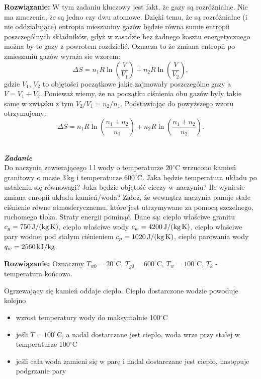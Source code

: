 \documentclass[11pt,a4paper]{article}
\newcounter{zadanie}\newcommand{\zadanie}[1][]{\addtocounter{zadanie}{1} ~\\  {\bf \emph{Zadanie \arabic{zadanie} #1 }} \\}
\begin{document}
\vskip 10pt
\noindent
\textbf{Rozwiązanie:}
W tym zadaniu kluczowy jest fakt, że gazy są rozróżnialne. Nie ma znaczenia, że są jedno czy dwu atomowe.  Dzięki temu, że są rozróżnialne (i nie oddziałujące) entropia mieszaniny gazów będzie równa sumie entropii poszczególnych składników, gdyż w zasadzie bez żadnego kosztu energetycznego można by te gazy z powrotem rozdzielić.  Oznacza to że zmiana entropii po zmieszaniu gazów wyraża sie wzorem:
\begin{equation}
  \Delta S = n_1 R \ln \left(\frac{V}{V_1}\right) +  n_2 R \ln \left(\frac{V}{V_2}\right),
\end{equation}
gdzie $V_1$, $V_2$ to objętości początkowe jakie zajmowały poszczególne gazy a $V  = V_1 + V_2$. Ponieważ wiemy, że na początku ciśnienia obu gazów były takie same w związku z tym $ V_2/V_1 = n_2/n_1$. Podstawiając do powyższego wzoru otrzymujemy:
\begin{equation}
\Delta S = n_1 R \ln(\frac{n_1+n_2}{n_1}) + n_2 R \ln(\frac{n_1+n_2}{n_2}).
\end{equation}

\newpage
\zadanie
Do naczynia zawierającego 1\,l wody o temperaturze $20^\circ$C wrzucono kamień granitowy
o masie 3\,kg i temperaturze $600^\circ$C. Jaka będzie temperatura układu
po ustaleniu się równowagi? Jaka będzie objętość cieczy w naczyniu?
Ile wyniesie zmiana enropii  układu kamień/woda?
Założ, że wewnątrz naczynia panuje stałe ciśnienie równe
atmosferycznemu, które jest utrzymywane za pomocą szczelnego, ruchomego tłoka.
Straty energii pominąć.
Dane są:
ciepło właściwe granitu $c_g = 750\,{\rm J/(kg\, K)}$,
ciepło właściwe wody $c_w = 4200\,{\rm J/(kg\, K)}$,
ciepło właściwe pary wodnej pod stałym ciśnieniem $c_p = 1020\,{\rm J/(kg\, K)}$,
ciepło parowania wody $q_w = 2560\,{\rm kJ/kg}$.
\newline

\vskip 10pt
\noindent
\textbf{Rozwiązanie:}
Oznaczmy $T_{w0} = 20^\circ$C, $T_{g0} = 600^\circ$C, $T_w=100^\circ$C,
$T_k$ - temperatura końcowa.


Ogrzewający się kamień oddaje ciepło.
Ciepło dostarczone wodzie powoduje kolejno
\begin{itemize}
	\item wzrost temperatury wody do maksymalnie 100$^\circ$C
	\item jeśli $T=100^\circ$C, a nadal dostarczane jest ciepło,  
	      woda wrze przy stałej w temperaturze 100$^\circ$C
	\item jeśli cała woda zamieni się w parę i nadal dostarczane jest ciepło, następuje podgrzanie pary
\end{itemize}
\end{document}
